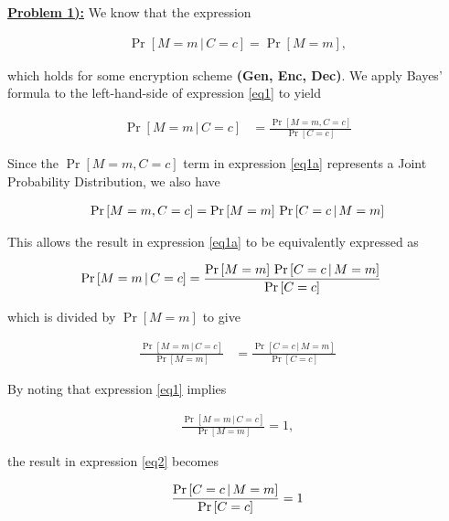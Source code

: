 \documentclass{article}[12]
\numberwithin{equation}{section}
\newcommand{\numbpr}[1]{\setcounter{section}{#1} \setcounter{equation}{0}}
\newcommand{\prob}[1]{\textbf{\underline{Problem #1):}}}
\begin{document}
\begin{flushleft}


\numbpr{1}
\prob{1} We know that the expression

\begin{align}
\Pr \left[ M = m \, \vert \, C = c \right] = \Pr \left[ M = m \right], \label{eq1}
\end{align}

which holds for some encryption scheme {\selectfont \textbf{(Gen, Enc, Dec)}}. We apply Bayes' formula to the left-hand-side of expression \ref{eq1} to yield

\begin{align}
\Pr \left[ M = m \, \vert \, C = c \right] &= \frac{ \Pr \left[ M = m , C = c \right] }{ \Pr \left[ C = c \right] } \label{eq1a}
\end{align}

Since the $\Pr \left[ M = m , C = c \right]$ term in expression \ref{eq1a} represents a Joint Probability Distribution, we also have

\begin{align}
\Pr \left[ M = m , C = c \right] = \Pr \left[ M = m \right] \, \Pr \left[ C = c \, \vert \, M = m \right] \notag
\end{align}

This allows the result in expression \ref{eq1a} to be equivalently expressed as

\begin{align}
\Pr \left[ M = m \, \vert \, C = c \right] &= \frac{ \Pr \left[ M = m \right] \, \Pr \left[ C = c \, \vert \, M = m \right] }{ \Pr \left[ C = c \right] } \notag
\end{align}

which is divided by $\Pr \left[ M = m \right]$ to give

\begin{align}
\frac{\Pr \left[ M = m \, \vert \, C = c \right] }{ \Pr \left[ M = m \right]} &= \frac{\Pr \left[ C = c \, \vert \, M = m \right] }{ \Pr \left[ C = c \right]} \label{eq2}
\end{align}

By noting that expression \ref{eq1} implies

\begin{align*}
\frac{\Pr \left[ M = m \, \vert \, C = c \right] }{ \Pr \left[ M = m \right]} = 1,
\end{align*}

the result in expression \ref{eq2} becomes

\begin{align}
\frac{\Pr \left[ C = c \, \vert \, M = m \right] }{ \Pr \left[ C = c \right]} = 1 \notag
\end{align}


\end{flushleft}
\end{document}
